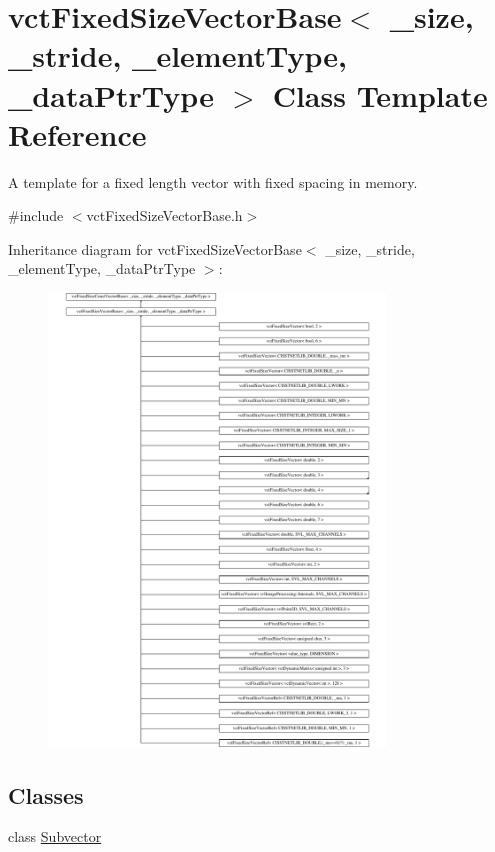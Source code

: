 \hypertarget{classvct_fixed_size_vector_base}{}\section{vct\+Fixed\+Size\+Vector\+Base$<$ \+\_\+size, \+\_\+stride, \+\_\+element\+Type, \+\_\+data\+Ptr\+Type $>$ Class Template Reference}
\label{classvct_fixed_size_vector_base}


A template for a fixed length vector with fixed spacing in memory.  




{\ttfamily \#include $<$vct\+Fixed\+Size\+Vector\+Base.\+h$>$}

Inheritance diagram for vct\+Fixed\+Size\+Vector\+Base$<$ \+\_\+size, \+\_\+stride, \+\_\+element\+Type, \+\_\+data\+Ptr\+Type $>$\+:\begin{figure}[H]
\begin{center}
\leavevmode
\includegraphics[height=12.000000cm]{dc/d4e/classvct_fixed_size_vector_base}
\end{center}
\end{figure}
\subsection*{Classes}
\begin{DoxyCompactItemize}
\item 
class \hyperlink{classvct_fixed_size_vector_base_1_1_subvector}{Subvector}
\end{DoxyCompactItemize}
